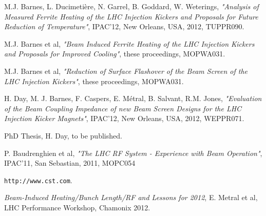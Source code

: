 \documentclass{JAC2003}
\begin{document}
\begin{thebibliography}{9}

M.J. Barnes, L. Ducimetière, N. Garrel, B. Goddard, W. Weterings, \emph{"Analysis of Measured Ferrite Heating of the LHC Injection Kickers and Proposals for Future Reduction of Temperature"}, IPAC'12, New Orleans, USA, 2012, TUPPR090.

 M.J. Barnes et al, \emph{"Beam Induced Ferrite Heating of the LHC Injection Kickers and Proposals for Improved Cooling"}, these proceedings, MOPWA031.

M.J. Barnes et al, \emph{"Reduction of Surface Flashover of the Beam Screen of the LHC Injection Kickers"}, these proceedings, MOPWA031.

H. Day, M. J. Barnes, F. Caspers, E. Métral, B. Salvant, R.M. Jones, \emph{"Evaluation of the Beam Coupling Impedance of new Beam Screen Designs for the LHC Injection Kicker Magnets"}, IPAC'12, New Orleans, USA, 2012, WEPPR071.

PhD Thesis, H. Day, to be published.

P. Baudrenghien et al, \emph{"The LHC RF System - Experience with Beam Operation"}, IPAC'11, San Sebastian, 2011, MOPC054

\texttt{http://www.cst.com}.

\emph{Beam-Induced Heating/Bunch Length/RF and Lessons for 2012}, E. Metral et al, LHC Performance Workshop, Chamonix 2012. 


\end{thebibliography}
\end{document}
